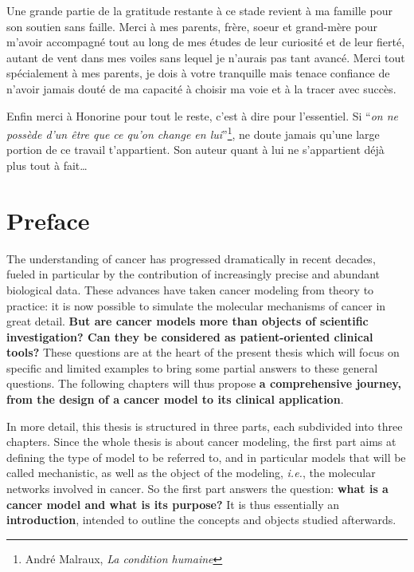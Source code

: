 \documentclass[a4paper,12pt,twoside,onecolumn,openright,final,oldfontcommands]{memoir}
\newcommand{\initial}[1]{
	\lettrine[lines=3,lhang=0.33,nindent=0em]{
		\color{gray}
     		{\textsc{#1}}}{}}
\newcommand{\clearemptydoublepage}{\newpage{\thispagestyle{empty}\cleardoublepage}}
\begin{document}
Une grande partie de la gratitude restante à ce stade revient à ma
famille pour son soutien sans faille. Merci à mes parents, frère, soeur
et grand-mère pour m'avoir accompagné tout au long de mes études de leur
curiosité et de leur fierté, autant de vent dans mes voiles sans lequel
je n'aurais pas tant avancé. Merci tout spécialement à mes parents, je
dois à votre tranquille mais tenace confiance de n'avoir jamais douté de
ma capacité à choisir ma voie et à la tracer avec succès.

Enfin merci à Honorine pour tout le reste, c'est à dire pour
l'essentiel. Si ``\emph{on ne possède d'un être que ce qu'on change en
lui}''\footnote{André Malraux, \emph{La condition humaine}}, ne doute
jamais qu'une large portion de ce travail t'appartient. Son auteur quant
à lui ne s'appartient déjà plus tout à fait\ldots{}

\clearemptydoublepage

\chapter*{Preface}

\initial{T}he understanding of cancer has progressed dramatically in
recent decades, fueled in particular by the contribution of increasingly
precise and abundant biological data. These advances have taken cancer
modeling from theory to practice: it is now possible to simulate the
molecular mechanisms of cancer in great detail. \textbf{But are cancer
models more than objects of scientific investigation? Can they be
considered as patient-oriented clinical tools?} These questions are at
the heart of the present thesis which will focus on specific and limited
examples to bring some partial answers to these general questions. The
following chapters will thus propose \textbf{a comprehensive journey,
from the design of a cancer model to its clinical application}.

In more detail, this thesis is structured in three parts, each
subdivided into three chapters. Since the whole thesis is about cancer
modeling, the first part aims at defining the type of model to be
referred to, and in particular models that will be called mechanistic,
as well as the object of the modeling, \emph{i.e.}, the molecular
networks involved in cancer. So the first part answers the question:
\textbf{what is a cancer model and what is its purpose?} It is thus
essentially an \textbf{introduction}, intended to outline the concepts
and objects studied afterwards.
\end{document}
